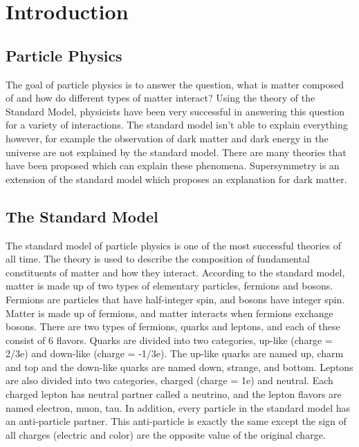 \chapter{Introduction}
\label{ch:intro}

\section{Particle Physics}
The goal of particle physics is to answer the question, what is matter composed of and how do different types of matter interact?
Using the theory of the Standard Model, physicists have been very successful in answering this question for a variety of interactions.
The standard model isn't able to explain everything however, for example the observation of dark matter and dark energy in the universe are not explained by the standard model.
There are many theories that have been proposed which can explain these phenomena.
Supersymmetry is an extension of the standard model which proposes an explanation for dark matter.

\section{The Standard Model}
The standard model of particle physics is one of the most successful theories of all time.
The theory is used to describe the composition of fundamental constituents of matter and how they interact.
According to the standard model, matter is made up of two types of elementary particles, fermions and bosons.
Fermions are particles that have half-integer spin, and bosons have integer spin.
Matter is made up of fermions, and matter interacts when fermions exchange bosons.
There are two types of fermions, quarks and leptons, and each of these consist of 6 flavors.
Quarks are divided into two categories, up-like (charge = 2/3e) and down-like (charge = -1/3e).
The up-like quarks are named up, charm and top and the down-like quarks are named down, strange, and bottom.
Leptons are also divided into two categories, charged (charge = 1e) and neutral.
Each charged lepton has neutral partner called a neutrino, and the lepton flavors are named electron, muon, tau.
In addition, every particle in the standard model has an anti-particle partner.
This anti-particle is exactly the same except the sign of all charges (electric and color) are the opposite value of the original charge.

